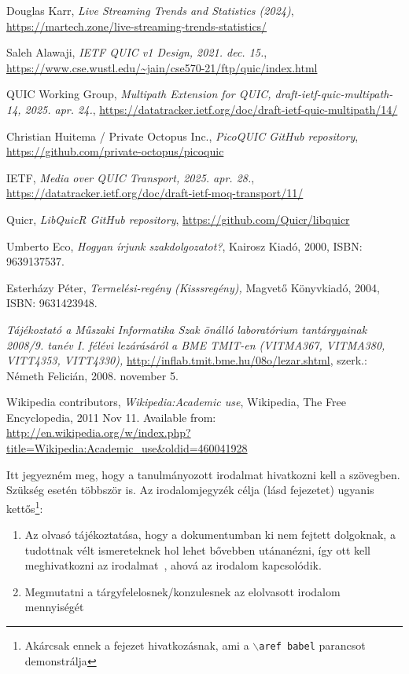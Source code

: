 \documentclass[a4paper,oneside]{article}
\begin{document}
\begin{thebibliography}{9}
\label{sec:tanulm-irod-jegyz}

 Douglas Karr, \emph{Live Streaming Trends and Statistics (2024)}, 
\url{https://martech.zone/live-streaming-trends-statistics/}

 Saleh Alawaji, \emph{IETF QUIC v1 Design, 2021. dec. 15.}, 
\url{https://www.cse.wustl.edu/~jain/cse570-21/ftp/quic/index.html}

 QUIC Working Group, \emph{Multipath Extension for QUIC, draft-ietf-quic-multipath-14, 2025. apr. 24.}, \url{https://datatracker.ietf.org/doc/draft-ietf-quic-multipath/14/}

 Christian Huitema / Private Octopus Inc., \emph{PicoQUIC GitHub repository}, \url{https://github.com/private-octopus/picoquic}

 IETF, \emph{Media over QUIC Transport, 2025. apr. 28.}, \url{https://datatracker.ietf.org/doc/draft-ietf-moq-transport/11/}

 Quicr, \emph{LibQuicR GitHub repository}, \url{https://github.com/Quicr/libquicr}


 Umberto Eco, \emph{Hogyan írjunk szakdolgozatot?},
  Kairosz Kiadó, 2000, ISBN: 9639137537.

 Esterházy Péter, \emph{Termelési-regény (Kisssregény),}
  Magvető Könyvkiadó, 2004, ISBN: 9631423948.

 \emph{Tájékoztató a Műszaki Informatika Szak önálló
    laboratórium tantárgyainak 2008/9. tanév I. félévi lezárásáról a
    BME TMIT-en (VITMA367, VITMA380, VITT4353, VITT4330),}
  \url{http://inflab.tmit.bme.hu/08o/lezar.shtml}, szerk.: Németh Felicián,
  2008. november 5.

 Wikipedia contributors, \emph{Wikipedia:Academic
    use}, Wikipedia, The Free Encyclopedia, 2011 Nov 11.  Available
  from: \\ \url{http://en.wikipedia.org/w/index.php?title=Wikipedia:Academic\_use\&oldid=460041928}

\end{thebibliography}

Itt jegyezném meg, hogy a tanulmányozott irodalmat hivatkozni kell a
szövegben.  Szükség esetén többször is.  Az irodalomjegyzék célja
(lásd  fejezetet) ugyanis
kettős\footnote{Akárcsak ennek a fejezet hivatkozásnak, ami a
  \texttt{$\backslash$aref babel} parancsot demonstrálja}:
\begin{enumerate}
\item Az olvasó tájékoztatása, hogy a dokumentumban ki nem fejtett
  dolgoknak, a tudottnak vélt ismereteknek hol lehet bővebben
  utánanézni, így ott kell meghivatkozni az irodalmat~\cite{eco,
    esterhazy}, ahová az irodalom kapcsolódik.
\item Megmutatni a tárgyfelelosnek/konzulesnek az elolvasott irodalom
  mennyiségét
\end{enumerate}
\end{document}
